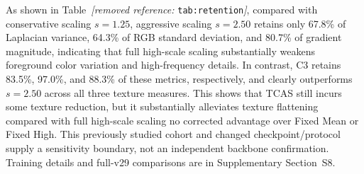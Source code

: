 \documentclass[times,twocolumn,final]{elsarticle}
\providecommand{\DIFadd}[1]{{\protect\color{blue} \sf #1}} %
\providecommand{\DIFdel}[1]{{\protect\color{red} \scriptsize #1}} %
\providecommand{\DIFaddbegin}{} %
\providecommand{\DIFaddend}{} %
\providecommand{\DIFdelend}{} %
\begin{document}

\DIFdel{As shown in Table~\textit{[removed reference: }\texttt{tab:retention}\textit{]}, compared with conservative scaling $s = 1.25$, aggressive scaling $s = 2.50$ retains only 67.8\% of Laplacian variance, 64.3\% of RGB standard deviation, and 80.7\% of gradient magnitude, indicating that full high-scale scaling substantially weakens foreground color variation and high-frequency details. In contrast, C3 retains 83.5\%, 97.0\%, and 88.3\% of these metrics, respectively, and clearly outperforms $s = 2.50$ across all three texture measures. This shows that TCAS still incurs some texture reduction, but it substantially alleviates texture flattening compared with full high-scale scaling}\DIFdelend \DIFaddbegin \DIFadd{no corrected advantage over Fixed Mean or Fixed High. This previously studied cohort and changed checkpoint/protocol supply a sensitivity boundary, not an independent backbone confirmation. Training details and full-v29 comparisons are in Supplementary Section~S8}\DIFaddend .
\end{document}
